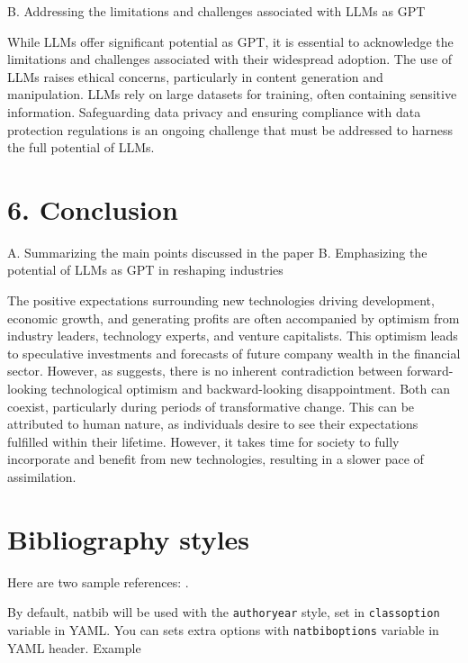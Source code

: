 \documentclass[preprint, 3p,
authoryear]{elsarticle} %
\begin{document}
B. Addressing the limitations and challenges associated with LLMs as GPT

While LLMs offer significant potential as GPT, it is essential to
acknowledge the limitations and challenges associated with their
widespread adoption. The use of LLMs raises ethical concerns,
particularly in content generation and manipulation. LLMs rely on large
datasets for training, often containing sensitive information.
Safeguarding data privacy and ensuring compliance with data protection
regulations is an ongoing challenge that must be addressed to harness
the full potential of LLMs.

\hypertarget{conclusion}{%
\section{6. Conclusion}\label{conclusion}}

A. Summarizing the main points discussed in the paper B. Emphasizing the
potential of LLMs as GPT in reshaping industries

The positive expectations surrounding new technologies driving
development, economic growth, and generating profits are often
accompanied by optimism from industry leaders, technology experts, and
venture capitalists. This optimism leads to speculative investments and
forecasts of future company wealth in the financial sector. However, as
\citep{paradox} suggests, there is no inherent contradiction between
forward-looking technological optimism and backward-looking
disappointment. Both can coexist, particularly during periods of
transformative change. This can be attributed to human nature, as
individuals desire to see their expectations fulfilled within their
lifetime. However, it takes time for society to fully incorporate and
benefit from new technologies, resulting in a slower pace of
assimilation.

\hypertarget{bibliography-styles}{%
\section{Bibliography styles}\label{bibliography-styles}}

Here are two sample references: \citeauthor{Feynman1963118}
\citetext{\citeyear{Feynman1963118}; \citealp{Dirac1953888}}.

By default, natbib will be used with the \texttt{authoryear} style, set
in \texttt{classoption} variable in YAML. You can sets extra options
with \texttt{natbiboptions} variable in YAML header. Example
\end{document}
